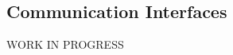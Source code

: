 \documentclass[../../../rasd.tex]{subfiles}
\begin{document}
\subsection{Communication Interfaces}
			WORK IN PROGRESS
\end{document}
